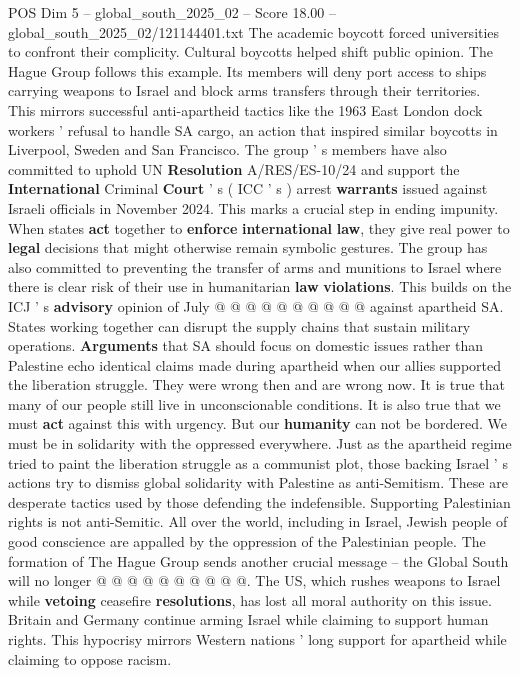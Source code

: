 \begin{textsample}{POS Dim 5 – global\_south\_2025\_02 – Score 18.00 – global\_south\_2025\_02/121144401.txt}
The academic boycott forced universities to confront their complicity.
Cultural boycotts helped shift public opinion.
The Hague Group follows this example.
Its members will deny port access to ships carrying weapons to Israel and block arms transfers through their territories.
This mirrors successful anti-apartheid tactics like the 1963 East London dock workers ' refusal to handle SA cargo, an action that inspired similar boycotts in Liverpool, Sweden and San Francisco.
The group ' s members have also committed to uphold UN \textbf{Resolution} A/RES/ES-10/24 and support the \textbf{International} Criminal \textbf{Court} ' s ( ICC ' s ) arrest \textbf{warrants} issued against Israeli officials in November 2024.
This marks a crucial step in ending impunity.
When states \textbf{act} together to \textbf{enforce} \textbf{international} \textbf{law}, they give real power to \textbf{legal} decisions that might otherwise remain symbolic gestures.
The group has also committed to preventing the transfer of arms and munitions to Israel where there is clear risk of their use in humanitarian \textbf{law} \textbf{violations}.
This builds on the ICJ ' s \textbf{advisory} opinion of July @ @ @ @ @ @ @ @ @ @ against apartheid SA.
States working together can disrupt the supply chains that sustain military operations. \textbf{Arguments} that SA should focus on domestic issues rather than Palestine echo identical claims made during apartheid when our allies supported the liberation struggle.
They were wrong then and are wrong now.
It is true that many of our people still live in unconscionable conditions.
It is also true that we must \textbf{act} against this with urgency.
But our \textbf{humanity} can not be bordered.
We must be in solidarity with the oppressed everywhere.
Just as the apartheid regime tried to paint the liberation struggle as a communist plot, those backing Israel ' s actions try to dismiss global solidarity with Palestine as anti-Semitism.
These are desperate tactics used by those defending the indefensible.
Supporting Palestinian rights is not anti-Semitic.
All over the world, including in Israel, Jewish people of good conscience are appalled by the oppression of the Palestinian people.
The formation of The Hague Group sends another crucial message -- the Global South will no longer @ @ @ @ @ @ @ @ @ @.
The US, which rushes weapons to Israel while \textbf{vetoing} ceasefire \textbf{resolutions}, has lost all moral authority on this issue.
Britain and Germany continue arming Israel while claiming to support human rights.
This hypocrisy mirrors Western nations ' long support for apartheid while claiming to oppose racism.

\end{textsample}
